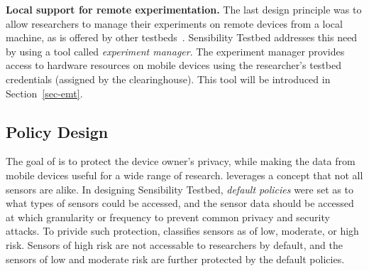 \textbf{Local support for remote experimentation.} 
The last design principle was to allow researchers to manage their 
experiments on remote devices from a local machine, as is offered 
by other testbeds~\cite{hibler2008large, peterson2006experiences}. Sensibility 
Testbed addresses this need by using a tool called \textit{experiment 
manager}. The experiment manager provides access to 
hardware resources on mobile devices using the researcher's testbed 
credentials (assigned by the clearinghouse). This tool will be introduced
in Section~\ref{sec-emt}.



\subsection{Policy Design}

The goal of \sysname is to protect the device owner's privacy, while making
the data from mobile devices useful for a wide range of research. \sysname
leverages a concept that not all sensors are alike. 
In designing Sensibility Testbed, \textit{default policies} were set as 
to what types of sensors could be accessed, and the sensor data should be
accessed at which granularity or frequency to prevent common privacy and
security attacks. To privide such protection, \sysname classifies sensors as 
of low, moderate, or high risk. Sensors of high risk are not accessable to 
researchers by default, and the sensors of low and moderate risk are further 
protected by the default policies.

